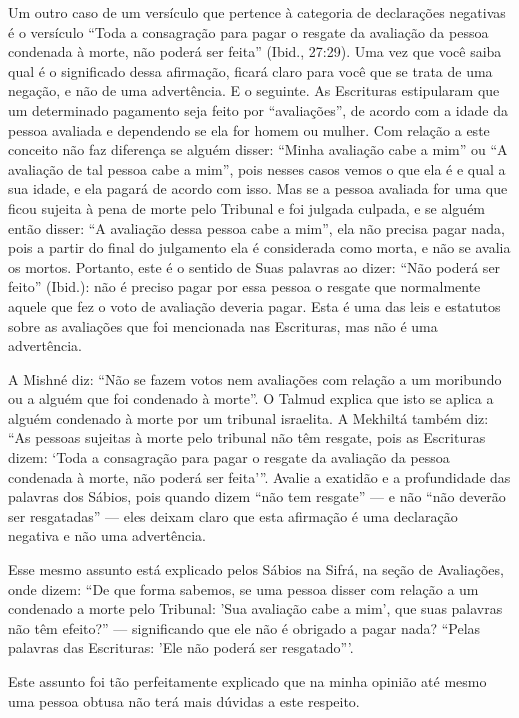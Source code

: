 Um outro caso de um versículo que pertence à categoria de declarações
negativas é o versículo ``Toda a consagração para pagar o resgate da
avaliação da pessoa condenada à morte, não poderá ser feita'' (Ibid.,
27:29). Uma vez que você saiba qual é o significado dessa afirmação,
ficará claro para você que se trata de uma negação, e não de uma
advertência. E o seguinte. As Escrituras estipularam que um determinado
pagamento seja feito por ``avaliações'', de acordo com a idade da pessoa
avaliada e dependendo se ela for homem ou mulher. Com relação a este
conceito não faz diferença se alguém disser: ``Minha avaliação cabe a
mim'' ou ``A avaliação de tal pessoa cabe a mim'', pois nesses casos
vemos o que ela é e qual a sua idade, e ela pagará de acordo com isso.
Mas se a pessoa avaliada for uma que ficou sujeita à pena de morte pelo
Tribunal e foi julgada culpada, e se alguém então disser: ``A avaliação
dessa pessoa cabe a mim'', ela não precisa pagar nada, pois a partir do
final do julgamento ela é considerada como morta, e não se avalia os
mortos. Portanto, este é o sentido de Suas palavras ao dizer: ``Não
poderá ser feito'' (Ibid.): não é preciso pagar por essa pessoa o
resgate que normalmente aquele que fez o voto de avaliação deveria
pagar. Esta é uma das leis e estatutos sobre as avaliações que foi
mencionada nas Escrituras, mas não é uma advertência.

A Mishné diz: ``Não se fazem votos nem avaliações com relação a um
moribundo ou a alguém que foi condenado à morte''. O Talmud explica que
isto se aplica a alguém condenado à morte por um tribunal israelita. A
Mekhiltá também diz: ``As pessoas sujeitas à morte pelo tribunal não têm
resgate, pois as Escrituras dizem: `Toda a consagração para pagar o
resgate da avaliação da pessoa condenada à morte, não poderá ser
feita'''. Avalie a exatidão e a profundidade das palavras dos Sábios,
pois quando dizem ``não tem resgate'' --- e não ``não deverão ser
resgatadas'' --- eles deixam claro que esta afirmação é uma declaração
negativa e não uma advertência.

Esse mesmo assunto está explicado pelos Sábios na Sifrá, na seção de
Avaliações, onde dizem: ``De que forma sabemos, se uma pessoa disser com
relação a um condenado a morte pelo Tribunal: 'Sua avaliação cabe a
mim', que suas palavras não têm efeito?'' --- significando que ele não é
obrigado a pagar nada? ``Pelas palavras das Escrituras: 'Ele não poderá
ser resgatado'''.

Este assunto foi tão perfeitamente explicado que na minha opinião até
mesmo uma pessoa obtusa não terá mais dúvidas a este respeito.

